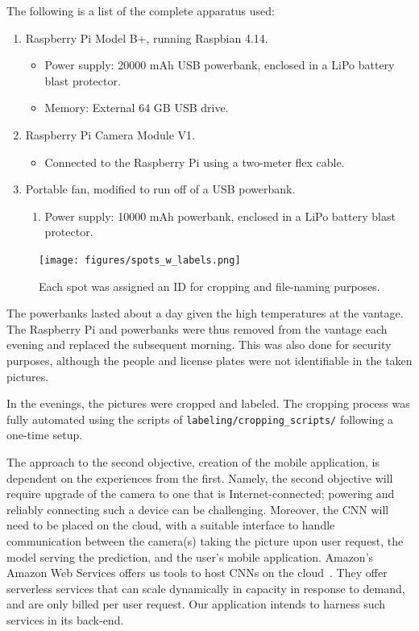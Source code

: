 \documentclass[a4paper, 11pt]{article} %
\begin{document}
	The following is a list of the complete apparatus used:
	\begin{enumerate}
		\item Raspberry Pi Model B+, running Raspbian 4.14.
		\begin{itemize}
			\item[] Power supply: 20000 mAh USB powerbank, enclosed in a LiPo battery blast protector.
			\item[] Memory: External 64 GB USB drive.
		\end{itemize}
		\item Raspberry Pi Camera Module V1.
		\begin{itemize}
			\item[] Connected to the Raspberry Pi using a two-meter flex cable.
		\end{itemize}
		\item Portable fan, modified to run off of a USB powerbank.
		\begin{enumerate}
			\item[] Power supply: 10000 mAh powerbank, enclosed in a LiPo battery blast protector.
		\end{enumerate}
	\end{enumerate}
	\begin{figure}[H]
		\centering
		\texttt{[image: figures/spots\_w\_labels.png]}
		\caption{Each spot was assigned an ID for cropping and file-naming purposes.}
	\end{figure}
	The powerbanks lasted about a day given the high temperatures at the vantage. The Raspberry Pi 
	and powerbanks were thus removed from the vantage each evening and replaced the subsequent 
	morning. This was also done for security purposes, although the people and license plates were not 
	identifiable in the taken pictures.

	In the evenings, the pictures were cropped and labeled. The cropping process was fully automated 
	using the scripts of \texttt{labeling/cropping\_scripts/} following a one-time setup.

The approach to the second objective, creation of the mobile application, is dependent on the 
experiences from the first. Namely, the second objective will require upgrade of the camera to one 
that is Internet-connected; powering and reliably connecting such a device can be challenging. 
Moreover, the CNN will need to be placed on the cloud, with a suitable interface to handle 
communication between the camera(s) taking the picture upon user request, the model serving 
the prediction, and the user's mobile application. Amazon's Amazon Web Services offers us tools 
to host CNNs on the cloud~\cite{aws}\relax. They offer serverless services that can scale 
dynamically in capacity in response to demand, and are only billed per user request. Our 
application intends to harness such services in its back-end.
\end{document}
